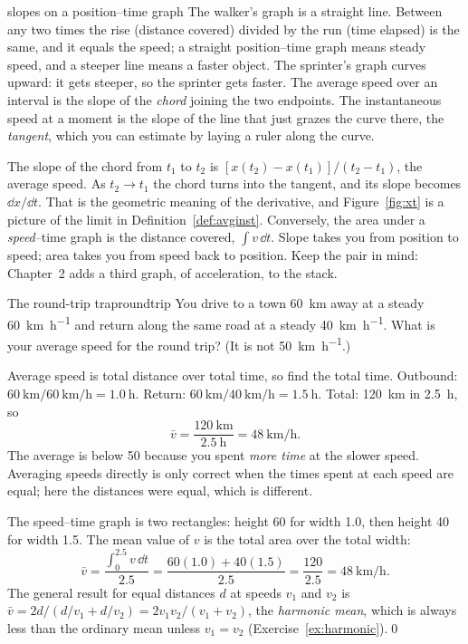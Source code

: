 \begin{twoviews}{slopes on a position--time graph}
\elem The walker's graph is a straight line. Between any two times the rise (distance covered) divided by the run (time elapsed) is the same, and it equals the speed; a straight position--time graph means steady speed, and a steeper line means a faster object. The sprinter's graph curves upward: it gets steeper, so the sprinter gets faster. The average speed over an interval is the slope of the \emph{chord} joining the two endpoints. The instantaneous speed at a moment is the slope of the line that just grazes the curve there, the \emph{tangent}, which you can estimate by laying a ruler along the curve.

\calc The slope of the chord from $t_1$ to $t_2$ is $[x(t_2) - x(t_1)]/(t_2 - t_1)$, the average speed. As $t_2 \to t_1$ the chord turns into the tangent, and its slope becomes $\dd x/\dd t$. That is the geometric meaning of the derivative, and Figure~\ref{fig:xt} is a picture of the limit in Definition~\ref{def:avginst}. Conversely, the area under a \emph{speed}--time graph is the distance covered, $\int v\,\dd t$. Slope takes you from position to speed; area takes you from speed back to position. Keep the pair in mind: Chapter~2 adds a third graph, of acceleration, to the stack.
\end{twoviews}

\begin{example}{The round-trip trap}{roundtrip}
You drive to a town \SI{60}{\kilo\metre} away at a steady \SI{60}{\kilo\metre\per\hour} and return along the same road at a steady \SI{40}{\kilo\metre\per\hour}. What is your average speed for the round trip? (It is not \SI{50}{\kilo\metre\per\hour}.)

\elem Average speed is total distance over total time, so find the total time. Outbound: $\SI{60}{\kilo\metre}/\SI{60}{\kilo\metre\per\hour} = \SI{1.0}{\hour}$. Return: $\SI{60}{\kilo\metre}/\SI{40}{\kilo\metre\per\hour} = \SI{1.5}{\hour}$. Total: \SI{120}{\kilo\metre} in \SI{2.5}{\hour}, so
\[
\bar v = \frac{\SI{120}{\kilo\metre}}{\SI{2.5}{\hour}} = \SI{48}{\kilo\metre\per\hour}.
\]
The average is below \num{50} because you spent \emph{more time} at the slower speed. Averaging speeds directly is only correct when the times spent at each speed are equal; here the distances were equal, which is different.

\calc The speed--time graph is two rectangles: height \num{60} for width \num{1.0}, then height \num{40} for width \num{1.5}. The mean value of $v$ is the total area over the total width:
\[
\bar v = \frac{\int_0^{2.5} v\,\dd t}{2.5} = \frac{60(1.0) + 40(1.5)}{2.5} = \frac{120}{2.5} = \SI{48}{\kilo\metre\per\hour}.
\]
The general result for equal distances $d$ at speeds $v_1$ and $v_2$ is $\bar v = 2d/(d/v_1 + d/v_2) = 2v_1 v_2/(v_1 + v_2)$, the \emph{harmonic mean}, which is always less than the ordinary mean unless $v_1 = v_2$ (Exercise~\ref{ex:harmonic}).\qed
\end{example}

